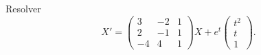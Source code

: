 Resolver
\[X'=\begin{pmatrix}3&-2&1\\2&-1&1\\-4&4&1\end{pmatrix}X+e^t\begin{pmatrix}t^2\\t\\1\end{pmatrix}.\]

